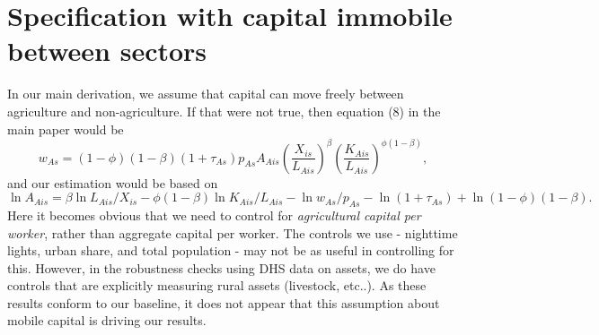 \documentclass[11pt]{article}
\begin{document}
\section{Specification with capital immobile between sectors}
In our main derivation, we assume that capital can move freely between agriculture and non-agriculture. If that were not true, then equation (8) in the main paper would be
\begin{equation}
    w_{As} = (1-\phi)(1-\beta) (1+\tau_{As}) p_{As} A_{Ais} \left(\frac{X_{is}}{L_{Ais}}\right)^{\beta} \left(\frac{K_{Ais}}{L_{Ais}}\right)^{\phi(1-\beta)},
\end{equation}
and our estimation would be based on
\begin{equation}
    \ln A_{Ais} = \beta \ln L_{Ais}/X_{is} - \phi(1-\beta) \ln K_{Ais}/L_{Ais} - \ln w_{As}/p_{As} - \ln (1+\tau_{As}) + \ln (1-\phi)(1-\beta).
\end{equation}
Here it becomes obvious that we need to control for \textit{agricultural capital per worker}, rather than aggregate capital per worker. The controls we use - nighttime lights, urban share, and total population - may not be as useful in controlling for this. However, in the robustness checks using DHS data on assets, we do have controls that are explicitly measuring rural assets (livestock, etc..). As these results conform to our baseline, it does not appear that this assumption about mobile capital is driving our results. 
\end{document}
